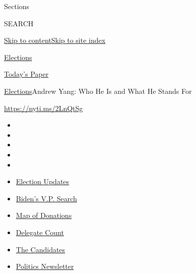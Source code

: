 Sections

SEARCH

\protect\hyperlink{site-content}{Skip to
content}\protect\hyperlink{site-index}{Skip to site index}

\href{https://www.nytimes.com/news-event/2020-election}{Elections}

\href{https://myaccount.nytimes.com/auth/login?response_type=cookie\&client_id=vi}{}

\href{https://www.nytimes.com/section/todayspaper}{Today's Paper}

\href{/news-event/2020-election}{Elections}\textbar{}Andrew Yang: Who He
Is and What He Stands For

\url{https://nyti.ms/2LnQtSg}

\begin{itemize}
\item
\item
\item
\item
\item
\end{itemize}

\begin{itemize}
\item
  \href{https://www.nytimes.com/2020/07/31/us/elections/biden-vs-trump.html?action=click\&pgtype=Article\&state=default\&region=TOP_BANNER\&context=storylines_menu}{Election
  Updates}
\item
  \href{https://www.nytimes.com/article/biden-vice-president-2020.html?action=click\&pgtype=Article\&state=default\&region=TOP_BANNER\&context=storylines_menu}{Biden's
  V.P. Search}
\item
  \href{https://www.nytimes.com/interactive/2020/07/24/us/politics/trump-biden-campaign-donors.html?action=click\&pgtype=Article\&state=default\&region=TOP_BANNER\&context=storylines_menu}{Map
  of Donations}
\item
  \href{https://www.nytimes.com/interactive/2020/us/elections/delegate-count-primary-results.html?action=click\&pgtype=Article\&state=default\&region=TOP_BANNER\&context=storylines_menu}{Delegate
  Count}
\item
  \href{https://www.nytimes.com/interactive/2019/us/politics/2020-presidential-candidates.html?action=click\&pgtype=Article\&state=default\&region=TOP_BANNER\&context=storylines_menu}{The
  Candidates}
\item
  \href{https://www.nytimes.com/newsletters/politics?action=click\&pgtype=Article\&state=default\&region=TOP_BANNER\&context=storylines_menu}{Politics
  Newsletter}
\end{itemize}

